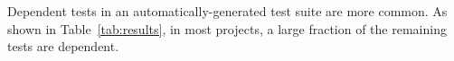 Dependent tests in an automatically-generated test suite
are more common.  As shown in Table~\ref{tab:results}, in most
projects, a large fraction of the remaining tests are dependent.


